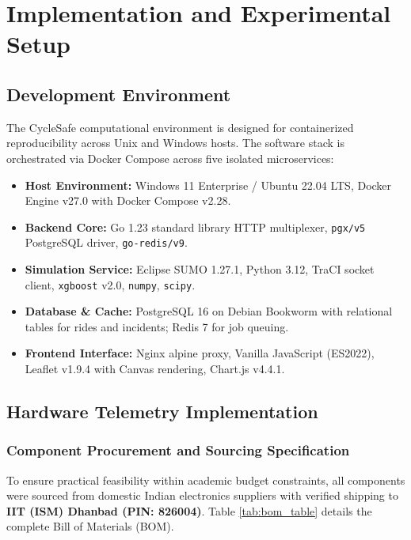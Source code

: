 \chapter{Implementation and Experimental Setup}
\label{chap:implementation}

\section{Development Environment}
\label{sec:dev_environment}
The CycleSafe computational environment is designed for containerized reproducibility across Unix and Windows hosts. The software stack is orchestrated via Docker Compose across five isolated microservices:

\begin{itemize}
    \item \textbf{Host Environment:} Windows 11 Enterprise / Ubuntu 22.04 LTS, Docker Engine v27.0 with Docker Compose v2.28.
    \item \textbf{Backend Core:} Go 1.23 standard library HTTP multiplexer, \texttt{pgx/v5} PostgreSQL driver, \texttt{go-redis/v9}.
    \item \textbf{Simulation Service:} Eclipse SUMO 1.27.1, Python 3.12, TraCI socket client, \texttt{xgboost} v2.0, \texttt{numpy}, \texttt{scipy}.
    \item \textbf{Database \& Cache:} PostgreSQL 16 on Debian Bookworm with relational tables for rides and incidents; Redis 7 for job queuing.
    \item \textbf{Frontend Interface:} Nginx alpine proxy, Vanilla JavaScript (ES2022), Leaflet v1.9.4 with Canvas rendering, Chart.js v4.4.1.
\end{itemize}

\section{Hardware Telemetry Implementation}

\subsection{Component Procurement and Sourcing Specification}
\label{sec:hardware_bom}
To ensure practical feasibility within academic budget constraints, all components were sourced from domestic Indian electronics suppliers with verified shipping to \textbf{IIT (ISM) Dhanbad (PIN: 826004)}. Table \ref{tab:bom_table} details the complete Bill of Materials (BOM).

